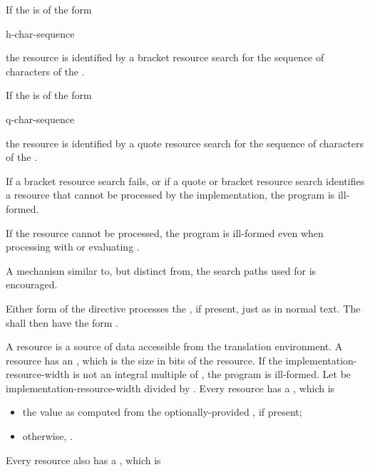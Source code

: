 \pnum
If the  is of the form
\begin{ncsimplebnf}
\terminal{<} h-char-sequence \terminal{>}
\end{ncsimplebnf}
the resource is identified by a bracket resource search
for the sequence of characters of the .

\pnum
If the  is of the form
\begin{ncsimplebnf}
 q-char-sequence 
\end{ncsimplebnf}
the resource is identified by a quote resource search
for the sequence of characters of the .

\pnum
If a bracket resource search fails,
or if a quote or bracket resource search identifies a resource
that cannot be processed by the implementation, the program is ill-formed.
\begin{note}
If the resource cannot be processed, the program is ill-formed
even when processing  with 
or evaluating .
\end{note}

\pnum
\recommended A mechanism similar to, but distinct from, the
search paths used for 
is encouraged.

\pnum
Either form of the  directive processes the
, if present, just as in normal text.
The  shall then have the form
.

\pnum
A resource is a source of data accessible from the translation environment.
A resource has an , which is the
size in bits of the resource.
If the implementation-resource-width is not an integral multiple of
, the program is ill-formed.
Let  be
implementation-resource-width divided by .
Every resource has a , which is

\begin{itemize}
\item
  the value as computed from the optionally-provided 
  , if present;
\item
  otherwise, .
\end{itemize}
Every resource also has a , which is

